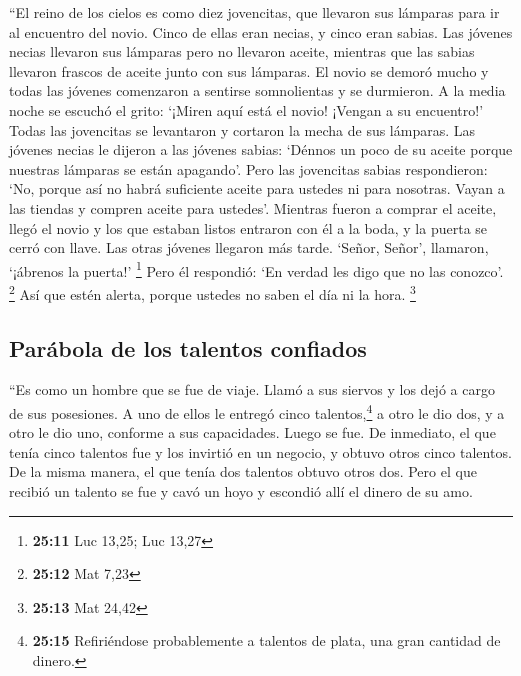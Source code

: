  ``El reino de los cielos es como diez jovencitas, que
llevaron sus lámparas para ir al encuentro del novio. 
Cinco de ellas eran necias, y cinco eran sabias.  Las
jóvenes necias llevaron sus lámparas pero no llevaron aceite,
 mientras que las sabias llevaron frascos de aceite junto
con sus lámparas.  El novio se demoró mucho y todas las
jóvenes comenzaron a sentirse somnolientas y se durmieron.
 A la media noche se escuchó el grito: `¡Miren aquí está
el novio! ¡Vengan a su encuentro!'  Todas las jovencitas
se levantaron y cortaron la mecha de sus lámparas. Las jóvenes necias le
dijeron a las jóvenes sabias:  `Dénnos un poco de su
aceite porque nuestras lámparas se están apagando'. Pero las jovencitas
sabias respondieron:  `No, porque así no habrá suficiente
aceite para ustedes ni para nosotras. Vayan a las tiendas y compren
aceite para ustedes'.  Mientras fueron a comprar el
aceite, llegó el novio y los que estaban listos entraron con él a la
boda, y la puerta se cerró con llave.  Las otras jóvenes
llegaron más tarde. `Señor, Señor', llamaron, `¡ábrenos la puerta!'
\footnote{\textbf{25:11} Luc 13,25; Luc 13,27}  Pero él
respondió: `En verdad les digo que no las conozco'. \footnote{\textbf{25:12}
  Mat 7,23}  Así que estén alerta, porque ustedes no
saben el día ni la hora. \footnote{\textbf{25:13} Mat 24,42}

\hypertarget{paruxe1bola-de-los-talentos-confiados}{%
\subsection{Parábola de los talentos
confiados}\label{paruxe1bola-de-los-talentos-confiados}}

 ``Es como un hombre que se fue de viaje. Llamó a sus
siervos y los dejó a cargo de sus posesiones.  A uno de
ellos le entregó cinco talentos,\footnote{\textbf{25:15} Refiriéndose
  probablemente a talentos de plata, una gran cantidad de dinero.} a
otro le dio dos, y a otro le dio uno, conforme a sus capacidades. Luego
se fue.  De inmediato, el que tenía cinco talentos fue y
los invirtió en un negocio, y obtuvo otros cinco talentos.
 De la misma manera, el que tenía dos talentos obtuvo
otros dos.  Pero el que recibió un talento se fue y cavó
un hoyo y escondió allí el dinero de su amo.

